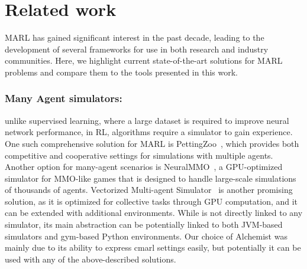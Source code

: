 \section{Related work}\label{sec:related}
MARL has gained significant interest in the past decade, 
 leading to the development of several frameworks 
 for use in both research and industry communities. 
Here, we highlight current state-of-the-art solutions 
 for MARL problems and compare 
 them to the tools presented in this work.
\subsubsection{Many Agent simulators:}   
unlike supervised learning, 
 where a large dataset is required to improve neural network performance, 
 in RL, algorithms require a simulator to gain experience. 
One such comprehensive solution for MARL is PettingZoo~\cite{NEURIPS2021_7ed2d345}, 
 which provides both competitive and cooperative settings 
 for simulations with multiple agents. 
%
Another option for many-agent scenarios is NeuralMMO~\cite{https://doi.org/10.48550/arxiv.1903.00784}, 
 a GPU-optimized simulator for MMO-like games 
 that is designed to handle large-scale simulations of thousands of agents.
% 
Vectorized Multi-agent Simulator~\cite{bettini2022vmas} is another promising solution, 
 as it is optimized for collective tasks through GPU computation, 
 and it can be extended with additional environments.
%
While \scarlib is not directly linked to any simulator, 
 its main abstraction can be potentially linked 
 to both JVM-based simulators and gym-based Python environments. 
 Our choice of Alchemist was mainly due to its ability to express \ac{cmarl} settings easily, but potentially it can be used with any of the above-described solutions.
